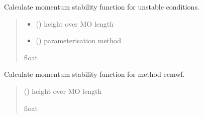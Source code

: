 \documentclass[letterpaper,10pt,english]{sphinxmanual}
\begin{document}
\begin{fulllineitems}
\label{\detokenize{users_guide:AirSeaFluxCode.flux_subs.stratification.psim_conv}}
\pysigstartsignatures
{}
\pysigstopsignatures
\sphinxAtStartPar
Calculate momentum stability function for unstable conditions.
\begin{quote}\begin{description}
\begin{itemize}
\item {} 
\sphinxAtStartPar
{} () \textendash{} height over MO length

\item {} 
\sphinxAtStartPar
{} () \textendash{} parameterisation method

\end{itemize}

\sphinxAtStartPar
{}

\sphinxAtStartPar
float

\end{description}\end{quote}

\end{fulllineitems}


\begin{fulllineitems}
\label{\detokenize{users_guide:AirSeaFluxCode.flux_subs.stratification.psim_ecmwf}}
\pysigstartsignatures
{}
\pysigstopsignatures
\sphinxAtStartPar
Calculate momentum stability function for method ecmwf.
\begin{quote}\begin{description}
\sphinxAtStartPar
{} () \textendash{} height over MO length

\sphinxAtStartPar
{}

\sphinxAtStartPar
float

\end{description}\end{quote}

\end{fulllineitems}
\end{document}
